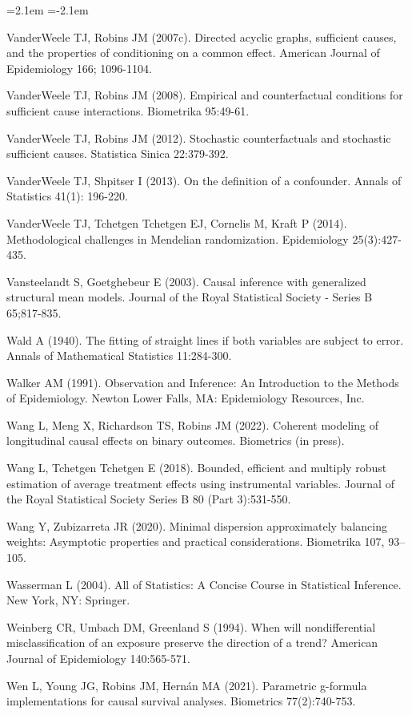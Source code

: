 \begin{list}{}{\leftmargin=2.1em   \itemindent=-2.1em \parsep=0pt \itemsep=1.6pt \topsep=4pt \rightmargin=0pt}
\item VanderWeele TJ, Robins JM (2007c). Directed acyclic graphs, sufficient causes, and the properties of conditioning on a common effect. American Journal of Epidemiology 166; 1096-1104.
\item VanderWeele TJ, Robins JM (2008). Empirical and counterfactual conditions for sufficient cause interactions. Biometrika 95:49-61.
\item VanderWeele TJ, Robins JM (2012). Stochastic counterfactuals and stochastic sufficient causes. Statistica Sinica 22:379-392.
\item VanderWeele TJ, Shpitser I (2013). On the definition of a confounder. Annals of Statistics 41(1): 196-220.
\item VanderWeele TJ, Tchetgen Tchetgen EJ, Cornelis M, Kraft P (2014). Methodological challenges in Mendelian randomization. Epidemiology 25(3):427-435.
\item Vansteelandt S, Goetghebeur E (2003). Causal inference with generalized structural mean models. Journal of the Royal Statistical Society - Series B 65;817-835.
\item Wald A (1940). The fitting of straight lines if both variables are subject to error. Annals of Mathematical Statistics 11:284-300.
\item Walker AM (1991). Observation and Inference: An Introduction to the Methods of Epidemiology. Newton Lower Falls, MA: Epidemiology Resources, Inc.
\item Wang L, Meng X, Richardson TS, Robins JM (2022). Coherent modeling of longitudinal causal effects on binary outcomes. Biometrics (in press).
\item Wang L, Tchetgen Tchetgen E (2018). Bounded, efficient and multiply robust estimation of average treatment effects using instrumental variables. Journal of the Royal Statistical Society Series B 80 (Part 3):531-550.
\item Wang Y, Zubizarreta JR (2020). Minimal dispersion approximately balancing weights: Asymptotic properties and practical considerations. Biometrika 107, 93–105.
\item Wasserman L (2004). All of Statistics: A Concise Course in Statistical Inference. New York, NY: Springer.
\item Weinberg CR, Umbach DM, Greenland S (1994). When will nondifferential misclassification of an exposure preserve the direction of a trend? American Journal of Epidemiology 140:565-571.
\item Wen L, Young JG, Robins JM, Hernán MA (2021). Parametric g-formula implementations for causal survival analyses. Biometrics 77(2):740-753.

\end{list}
